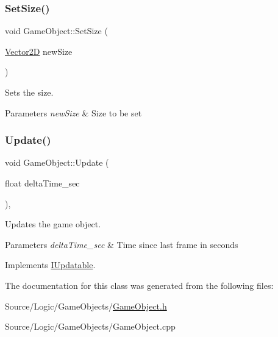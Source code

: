 \subsubsection{\texorpdfstring{Set\+Size()}{SetSize()}}
{\footnotesize\ttfamily void Game\+Object\+::\+Set\+Size (\begin{DoxyParamCaption}\item[{\mbox{\hyperlink{struct_vector2_d}{Vector2D}}}]{new\+Size }\end{DoxyParamCaption})\hspace{0.3cm}{\ttfamily [inline]}}



Sets the size. 


\begin{DoxyParams}{Parameters}
{\em new\+Size} & Size to be set \\
\hline
\end{DoxyParams}
\mbox{\label{class_game_object_a931541422ec57567e1d46436d97b874c}} 
\subsubsection{\texorpdfstring{Update()}{Update()}}
{\footnotesize\ttfamily void Game\+Object\+::\+Update (\begin{DoxyParamCaption}\item[{float}]{delta\+Time\+\_\+sec }\end{DoxyParamCaption})\hspace{0.3cm}{\ttfamily [override]}, {\ttfamily [virtual]}}



Updates the game object. 


\begin{DoxyParams}{Parameters}
{\em delta\+Time\+\_\+sec} & Time since last frame in seconds \\
\hline
\end{DoxyParams}


Implements \mbox{\hyperlink{class_i_updatable_a291a40a3422a0b02ef4c10e1d1570eb0}{I\+Updatable}}.



The documentation for this class was generated from the following files\+:\begin{DoxyCompactItemize}
\item 
Source/\+Logic/\+Game\+Objects/\mbox{\hyperlink{_game_object_8h}{Game\+Object.\+h}}\item 
Source/\+Logic/\+Game\+Objects/Game\+Object.\+cpp\end{DoxyCompactItemize}
